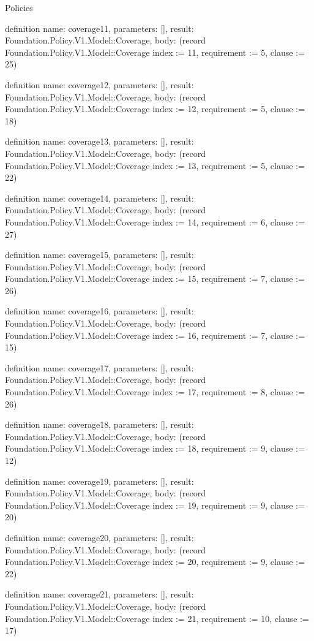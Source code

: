 \begin{lexlean}{Policies}
\begin{semanticmodule}
definition{
  name: coverage11,
  parameters: [],
  result: Foundation.Policy.V1.Model::Coverage,
  body: (record Foundation.Policy.V1.Model::Coverage {index := 11, requirement := 5, clause := 25})
}

definition{
  name: coverage12,
  parameters: [],
  result: Foundation.Policy.V1.Model::Coverage,
  body: (record Foundation.Policy.V1.Model::Coverage {index := 12, requirement := 5, clause := 18})
}

definition{
  name: coverage13,
  parameters: [],
  result: Foundation.Policy.V1.Model::Coverage,
  body: (record Foundation.Policy.V1.Model::Coverage {index := 13, requirement := 5, clause := 22})
}

definition{
  name: coverage14,
  parameters: [],
  result: Foundation.Policy.V1.Model::Coverage,
  body: (record Foundation.Policy.V1.Model::Coverage {index := 14, requirement := 6, clause := 27})
}

definition{
  name: coverage15,
  parameters: [],
  result: Foundation.Policy.V1.Model::Coverage,
  body: (record Foundation.Policy.V1.Model::Coverage {index := 15, requirement := 7, clause := 26})
}

definition{
  name: coverage16,
  parameters: [],
  result: Foundation.Policy.V1.Model::Coverage,
  body: (record Foundation.Policy.V1.Model::Coverage {index := 16, requirement := 7, clause := 15})
}

definition{
  name: coverage17,
  parameters: [],
  result: Foundation.Policy.V1.Model::Coverage,
  body: (record Foundation.Policy.V1.Model::Coverage {index := 17, requirement := 8, clause := 26})
}

definition{
  name: coverage18,
  parameters: [],
  result: Foundation.Policy.V1.Model::Coverage,
  body: (record Foundation.Policy.V1.Model::Coverage {index := 18, requirement := 9, clause := 12})
}

definition{
  name: coverage19,
  parameters: [],
  result: Foundation.Policy.V1.Model::Coverage,
  body: (record Foundation.Policy.V1.Model::Coverage {index := 19, requirement := 9, clause := 20})
}

definition{
  name: coverage20,
  parameters: [],
  result: Foundation.Policy.V1.Model::Coverage,
  body: (record Foundation.Policy.V1.Model::Coverage {index := 20, requirement := 9, clause := 22})
}

definition{
  name: coverage21,
  parameters: [],
  result: Foundation.Policy.V1.Model::Coverage,
  body: (record Foundation.Policy.V1.Model::Coverage {index := 21, requirement := 10, clause := 17})
}


\end{semanticmodule}
\end{lexlean}
